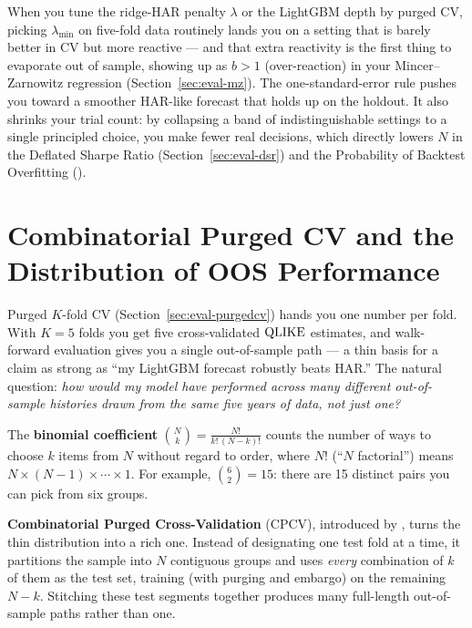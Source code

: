 \begin{projectconnection}
When you tune the ridge-HAR penalty $\lambda$ or the LightGBM depth by purged CV, picking $\lambda_{\min}$ on five-fold data routinely lands you on a setting that is barely better in CV but more reactive --- and that extra reactivity is the first thing to evaporate out of sample, showing up as $b > 1$ (over-reaction) in your Mincer--Zarnowitz regression (Section~\ref{sec:eval-mz}).
The one-standard-error rule pushes you toward a smoother HAR-like forecast that holds up on the holdout.
It also shrinks your trial count: by collapsing a band of indistinguishable settings to a single principled choice, you make fewer real decisions, which directly lowers $N$ in the Deflated Sharpe Ratio (Section~\ref{sec:eval-dsr}) and the Probability of Backtest Overfitting ().
\end{projectconnection}


\section{Combinatorial Purged CV and the Distribution of OOS Performance}
\label{sec:ch16:cpcv}

Purged $K$-fold CV (Section~\ref{sec:eval-purgedcv}) hands you one number per fold.
With $K = 5$ folds you get five cross-validated $\operatorname{QLIKE}$ estimates, and walk-forward evaluation gives you a single out-of-sample path --- a thin basis for a claim as strong as ``my LightGBM forecast robustly beats HAR.''
The natural question: \emph{how would my model have performed across many different out-of-sample histories drawn from the same five years of data, not just one?}

\begin{prereq}
The \textbf{binomial coefficient} $\binom{N}{k} = \frac{N!}{k!\,(N-k)!}$ counts the number of ways to choose $k$ items from $N$ without regard to order, where $N!$ (``$N$ factorial'') means $N \times (N-1) \times \cdots \times 1$.
For example, $\binom{6}{2} = 15$: there are 15 distinct pairs you can pick from six groups.
\end{prereq}

\textbf{Combinatorial Purged Cross-Validation} (CPCV), introduced by \citet{LopezdePrado2018}, turns the thin distribution into a rich one.
Instead of designating one test fold at a time, it partitions the sample into $N$ contiguous groups and uses \emph{every} combination of $k$ of them as the test set, training (with purging and embargo) on the remaining $N-k$.
Stitching these test segments together produces many full-length out-of-sample paths rather than one.

